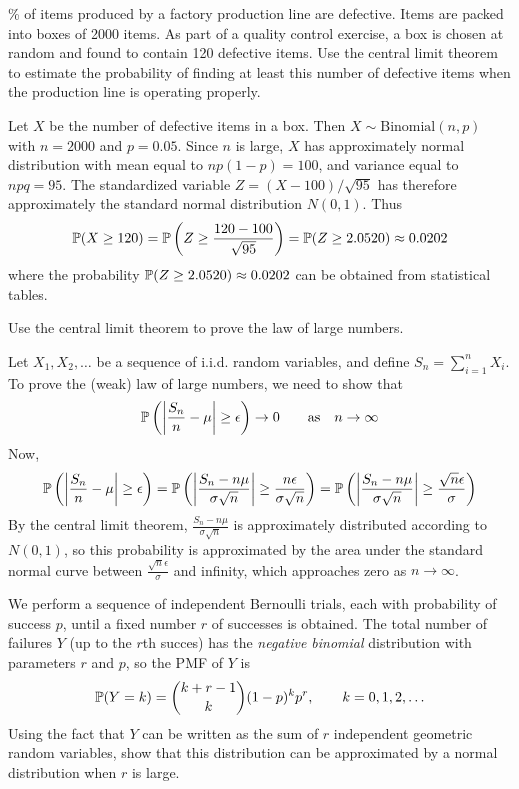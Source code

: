 \begin{exercise}
\begin{questions}
\% of items produced by a factory production line are defective. Items are packed into boxes of 2000 items. As part of a quality control exercise, a box is chosen at random and found to contain 120 defective items. Use the central limit theorem to estimate the probability of finding at least this number of defective items when the production line is operating properly.
\begin{answer} %
Let $X$ be the number of defective items in a box. Then $X\sim\text{Binomial}(n,p)$ with $n=2000$ and $p=0.05$. Since $n$ is large, $X$ has approximately normal distribution with mean equal to $np(1-p)=100$, and variance equal to $npq=95$. The standardized variable $Z=(X-100)/\sqrt{95}$ has therefore approximately the standard normal distribution $N(0,1)$.
Thus
\[
\mathbb{P}(X\geq 120) = \mathbb{P}\left(Z\geq\frac{120 - 100}{\sqrt{95}}\right) = \mathbb{P}(Z\geq 2.0520) \approx 0.0202
\]
where the probability $\mathbb{P}(Z\geq 2.0520)\approx 0.0202$ can be obtained from statistical tables.
\end{answer}


\question
Use the central limit theorem to prove the law of large numbers.
\begin{answer} %
Let $X_1,X_2,\ldots$ be a sequence of i.i.d. random variables, and define $S_n=\sum_{i=1}^n X_i$. To prove the (weak) law of large numbers, we need to show that
\[
\mathbb{P}\left(\left|\frac{S_n}{n}-\mu\right|\geq\epsilon\right) \to 0 \qquad\text{as}\quad n\to\infty
\]
Now,
\[
\mathbb{P}\left(\left|\frac{S_n}{n}-\mu\right|\geq\epsilon\right)
	= \mathbb{P}\left(\left|\frac{S_n-n\mu}{\sigma\sqrt{n}}\right|\geq\frac{n\epsilon}{\sigma\sqrt{n}}\right)
	= \mathbb{P}\left(\left|\frac{S_n-n\mu}{\sigma\sqrt{n}}\right|\geq\frac{\sqrt{n}\epsilon}{\sigma}\right)
\]
By the central limit theorem, $\displaystyle\frac{S_n-n\mu}{\sigma\sqrt{n}}$ is approximately distributed according to $N(0,1)$, so this probability is approximated by the area under the standard normal curve between $\displaystyle\frac{\sqrt{n}\epsilon}{\sigma}$ and infinity, which approaches zero as $n\to\infty$.
\end{answer}


\question
We perform a sequence of independent Bernoulli trials, each with probability of success $p$, until a fixed number $r$ of successes is obtained. The total number of failures $Y$ (up to the $r$th succes) has the \emph{negative binomial} distribution with parameters $r$ and $p$, so the PMF of $Y$ is
\[
\mathbb{P}(Y=k) = \binom{k+r-1}{k} (1-p)^k p^r,\qquad k=0,1,2,\ldots
\]
Using the fact that $Y$ can be written as the sum of $r$ independent geometric random variables, show that this distribution can be approximated by a normal distribution when $r$ is large.


\end{questions}
\end{exercise}
